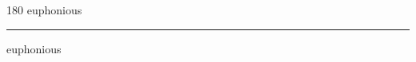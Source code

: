 
\begin{frame}
\begin{center}
\begin{turn}{180}
{\fontsize{2.5cm}{1em}\selectfont euphonious}
\end{turn}
\vspace{1em}\par  
\hrule
\vspace{1em}\par  
{\fontsize{2.5cm}{1em}\selectfont euphonious}
\end{center}
\end{frame}
